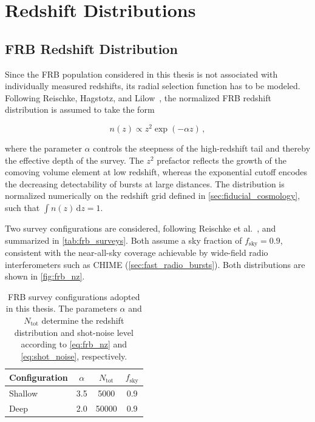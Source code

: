 \section{Redshift Distributions} \label{sec:redshift_distribution}

\subsection{FRB Redshift Distribution} \label{sec:frb_redshift_distribution}
Since the FRB population considered in this thesis is not associated with individually measured
redshifts, its radial selection function has to be modeled. Following
Reischke, Hagstotz, and Lilow~\cite{Reischke_2021}, the normalized FRB redshift distribution is
assumed to take the form

\begin{equation}\label{eq:frb_nz}
    n(z) \propto z^2 \exp(-\alpha z) \,,
\end{equation}

where the parameter $\alpha$ controls the steepness of the high-redshift tail and thereby the
effective depth of the survey. The $z^2$ prefactor reflects the growth of the comoving volume
element at low redshift, whereas the exponential cutoff encodes the decreasing detectability of
bursts at large distances. The distribution is normalized numerically on the redshift grid defined in
\autoref{sec:fiducial_cosmology}, such that $\int n(z)\,\mathrm{d}z = 1$. 

Two survey configurations are considered, following Reischke et al.~\cite{Reischke_2021}, and summarized in
\autoref{tab:frb_surveys}. Both assume a sky fraction of $f_{\mathrm{sky}} = 0.9$, consistent with the
near-all-sky coverage achievable by wide-field radio interferometers such as CHIME
(\autoref{sec:fast_radio_bursts}). Both distributions are shown in
\autoref{fig:frb_nz}.

\begin{table}
    \centering
    \caption{FRB survey configurations adopted in this thesis. 
    The
    parameters $\alpha$ and $N_{\mathrm{tot}}$ determine the redshift distribution and shot-noise
    level according to \autoref{eq:frb_nz} and \autoref{eq:shot_noise}, respectively.
    }
    \label{tab:frb_surveys}
    \begin{tabular}{
        l@{\hspace{1.0em}}
        S[table-format=1.1]
        @{\hspace{0.8em}}
        S[table-format=5.0]
        @{\hspace{0.8em}}
        S[table-format=1.1]
        }
        \toprule
        Configuration & {$\alpha$} & {$N_{\mathrm{tot}}$} & {$f_{\mathrm{sky}}$} \\
        \midrule
        Shallow & 3.5 & 5000  & 0.9 \\
        Deep    & 2.0 & 50000 & 0.9 \\
        \bottomrule
    \end{tabular}
\end{table}

